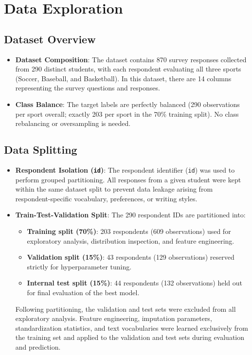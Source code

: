 \documentclass[12pt]{article}
\begin{document}
\section{Data Exploration}\label{sec:data-exploration}

\subsection*{Dataset Overview}
\begin{itemize}[leftmargin=1.5em]
    \item \textbf{Dataset Composition}: The dataset contains 870 survey responses collected from 290 distinct students, with each respondent evaluating all three sports (Soccer, Baseball, and Basketball). In this dataset, there are 14 columns representing the survey questions and responses.
    \item \textbf{Class Balance}: The target labels are perfectly balanced (290 observations per sport overall; exactly 203 per sport in the 70\% training split). No class rebalancing or oversampling is needed.
\end{itemize}

\subsection*{Data Splitting}
\begin{itemize}[leftmargin=1.5em]
    \item \textbf{Respondent Isolation (\texttt{id})}: The respondent identifier (\texttt{id}) was used to perform grouped partitioning. All responses from a given student were kept within the same dataset split to prevent data leakage arising from respondent-specific vocabulary, preferences, or writing styles.
    \item \textbf{Train-Test-Validation Split}: The 290 respondent IDs are partitioned into:
    \begin{itemize}
        \item \textbf{Training split (70\%)}: 203 respondents (609 observations) used for exploratory analysis, distribution inspection, and feature engineering.
        \item \textbf{Validation split (15\%)}: 43 respondents (129 observations) reserved strictly for hyperparameter tuning.
        \item \textbf{Internal test split (15\%)}: 44 respondents (132 observations) held out for final evaluation of the best model.
    \end{itemize}

    Following partitioning, the validation and test sets were excluded from all exploratory analysis. Feature engineering, imputation parameters, standardization statistics, and text vocabularies were learned exclusively from the training set and applied to the validation and test sets during evaluation and prediction.
\end{itemize}
\end{document}
